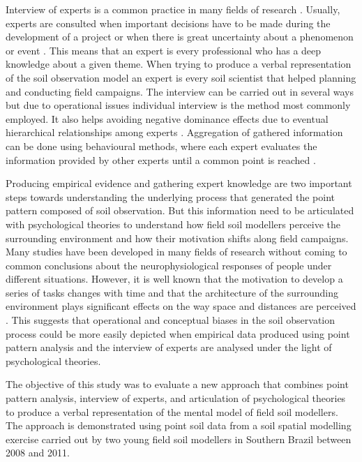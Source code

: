 Interview of experts is a common practice in many fields of research \cite{OHaganEtAl2006}. Usually, experts 
are consulted when important decisions have to be made during the development of a project or when there is 
great uncertainty about a phenomenon or event \cite{MeyerEtAl2001}. This means that an expert is every 
professional who has a deep knowledge about a given theme. When trying to produce a verbal representation of 
the soil observation model an expert is every soil scientist that helped planning and conducting field 
campaigns. The interview can be carried out in several ways \cite{Cooke1991, MeyerEtAl2001, OHaganEtAl2006} but
due to operational issues individual interview is the method most commonly employed. It also helps avoiding 
negative dominance effects due to eventual hierarchical relationships among experts \cite{Cooke1991}. 
Aggregation of gathered information can be done using behavioural methods, where each expert evaluates the 
information provided by other experts until a common point is reached \cite{OrsiEtAl2011}.

Producing empirical evidence and gathering expert knowledge are two important steps towards understanding the 
underlying process that generated the point pattern composed of soil observation. But this information need to 
be articulated with psychological theories to understand how field soil modellers perceive the surrounding 
environment and how their motivation shifts along field campaigns. Many studies have been developed in many 
fields of research \cite{Hull1932, BonnesEtAl2002, StampsEtAl2004, BonezziEtAl2011, Toure-TilleryEtAl2011a} 
without coming to common conclusions about the neurophysiological responses of people under different 
situations. However, it is well known that the motivation to develop a series of tasks changes with time 
\cite{BonezziEtAl2011, Toure-TilleryEtAl2011a} and that the architecture of the surrounding environment plays 
significant effects on the way space and distances are perceived \cite{Coeterier1994, EpsteinEtAl1998}. This 
suggests that operational and conceptual biases in the soil observation process could be more easily depicted 
when empirical data produced using point pattern analysis and the interview of experts are analysed under 
the light of psychological theories.

The objective of this study was to evaluate a new approach that combines point pattern analysis, interview of
experts, and articulation of psychological theories to produce a verbal representation of the mental model of 
field soil modellers. The approach is demonstrated using point soil data from a soil spatial modelling 
exercise carried out by two young field soil modellers in Southern Brazil between \num{2008} and \num{2011}.

